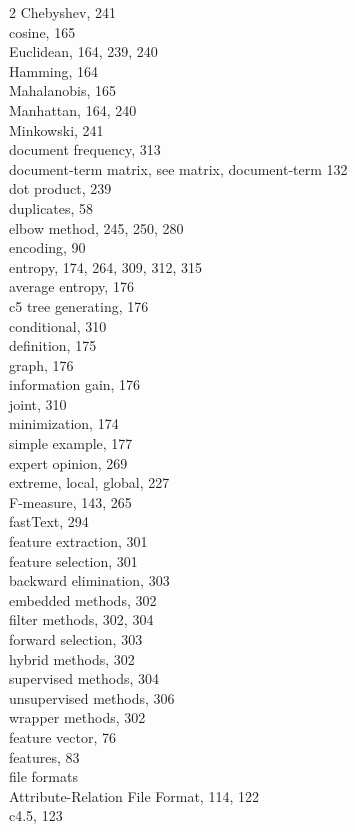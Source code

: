 \documentclass[twoside,11pt]{book}
\begin{document}
\begin{multicols}{2}
Chebyshev, 241\\
cosine, 165\\
Euclidean, 164, 239, 240\\
Hamming, 164\\
Mahalanobis, 165\\
Manhattan, 164, 240\\
Minkowski, 241\\
document frequency, 313\\
document-term matrix, see matrix, document-term 132\\
dot product, 239\\
duplicates, 58\\
elbow method, 245, 250, 280\\
encoding, 90\\
entropy, 174, 264, 309, 312, 315\\
average entropy, 176\\
c5 tree generating, 176\\
conditional, 310\\
definition, 175\\
graph, 176\\
information gain, 176\\
joint, 310\\
minimization, 174\\
simple example, 177\\
expert opinion, 269\\
extreme, local, global, 227\\
F-measure, 143, 265\\
fastText, 294\\
feature extraction, 301\\
feature selection, 301\\
backward elimination, 303\\
embedded methods, 302\\
filter methods, 302, 304\\
forward selection, 303\\
hybrid methods, 302\\
supervised methods, 304\\
unsupervised methods, 306\\
wrapper methods, 302\\
feature vector, 76\\
features, 83\\
file formats\\
Attribute-Relation File Format, 114, 122\\
c4.5, 123\\

\end{multicols}
\end{document}
